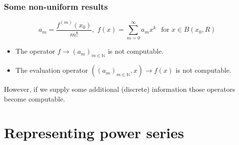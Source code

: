 \documentclass[xcolor=pdftex,dvipsnames,table]{beamer}
\newcommand{\N}{\ensuremath{\mathbb{N}}}
\begin{document}
\begin{frame}
\frametitle{Some non-uniform results}
$$a_m =\frac{f^{(m)}(x_0)}{m!} 
, \,\, f(x) = \sum_{m=0}^\infty a_mx^k \,\ \text{ for } x \in B(x_0,R)
$$
\vfill
\begin{theorem}[M\"uller (1995)]
\begin{itemize}
\item The operator $f \to (a_m)_{m \in \N}$ is not computable.
\item The evaluation operator $((a_m)_{m \in \N},x) \to f(x) $ is not computable.
\end{itemize}
\end{theorem}
\pause
However, if we supply some additional (discrete) information those operators become computable.
\end{frame}
\section{Representing power series}
\end{document}
